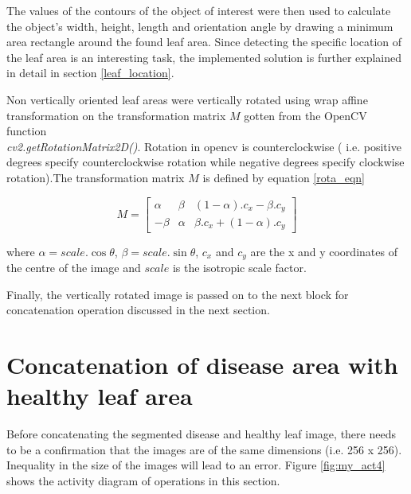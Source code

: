 The values of the contours of the object of interest were then used to calculate the object’s width, height, length and orientation angle by drawing a minimum area rectangle around the found leaf area. Since detecting the specific location of the leaf area is an interesting task, the implemented solution is further explained in detail in section \ref{leaf_location}.

Non vertically oriented leaf areas were vertically rotated using wrap affine transformation on the transformation matrix $M$ gotten from the OpenCV function\\ \textit{cv2.getRotationMatrix2D()}. Rotation in opencv is counterclockwise ( i.e. positive degrees specify counterclockwise rotation while negative degrees specify clockwise rotation).The transformation matrix $M$ is defined by equation \ref{rota_eqn}


\begin{equation} \label{rota_eqn}
M = 
\begin{bmatrix}
\alpha & \beta & (1-\alpha).c_x -\beta.c_y\\
-\beta & \alpha & \beta.c_x+(1-\alpha).c_y
\end{bmatrix}
\end{equation}

where $ \alpha = scale.\cos{\theta}$, $\beta = scale.\sin{\theta}$, $c_x$  and $c_y$ are the x and y coordinates of the centre of the image and $scale$ is the isotropic scale factor. 

Finally, the vertically rotated image is passed on to the next block for concatenation operation discussed in the next section.

\section{Concatenation of disease area with healthy leaf area}
Before concatenating the segmented disease and healthy leaf image, there needs to be a confirmation that the images are of the same dimensions (i.e. 256 x 256). Inequality in the size of the images will lead to an error. Figure \ref{fig:my_act4} shows the activity diagram of operations in this section.


